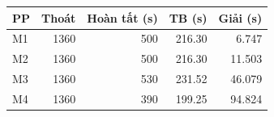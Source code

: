 \begin{center}\small
\begin{tabular}{lrrrr}
\toprule
PP & Thoát & Hoàn tất (s) & TB (s) & Giải (s)\\\midrule
M1 & 1360 & 500 & 216.30 & 6.747\\
M2 & 1360 & 500 & 216.30 & 11.503\\
M3 & 1360 & 530 & 231.52 & 46.079\\
M4 & 1360 & 390 & 199.25 & 94.824\\
\bottomrule\end{tabular}\end{center}